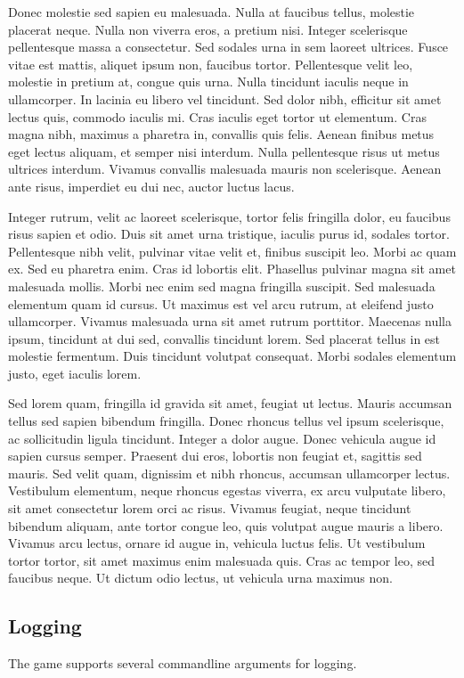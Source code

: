 \documentclass[a4paper,11pt,report]{scrartcl}
\begin{document}
Donec molestie sed sapien eu malesuada. Nulla at faucibus tellus, molestie placerat neque. Nulla non viverra eros, a pretium nisi. Integer scelerisque pellentesque massa a consectetur. Sed sodales urna in sem laoreet ultrices. Fusce vitae est mattis, aliquet ipsum non, faucibus tortor. Pellentesque velit leo, molestie in pretium at, congue quis urna. Nulla tincidunt iaculis neque in ullamcorper. In lacinia eu libero vel tincidunt. Sed dolor nibh, efficitur sit amet lectus quis, commodo iaculis mi. Cras iaculis eget tortor ut elementum. Cras magna nibh, maximus a pharetra in, convallis quis felis. Aenean finibus metus eget lectus aliquam, et semper nisi interdum. Nulla pellentesque risus ut metus ultrices interdum. Vivamus convallis malesuada mauris non scelerisque. Aenean ante risus, imperdiet eu dui nec, auctor luctus lacus.

Integer rutrum, velit ac laoreet scelerisque, tortor felis fringilla dolor, eu faucibus risus sapien et odio. Duis sit amet urna tristique, iaculis purus id, sodales tortor. Pellentesque nibh velit, pulvinar vitae velit et, finibus suscipit leo. Morbi ac quam ex. Sed eu pharetra enim. Cras id lobortis elit. Phasellus pulvinar magna sit amet malesuada mollis. Morbi nec enim sed magna fringilla suscipit. Sed malesuada elementum quam id cursus. Ut maximus est vel arcu rutrum, at eleifend justo ullamcorper. Vivamus malesuada urna sit amet rutrum porttitor. Maecenas nulla ipsum, tincidunt at dui sed, convallis tincidunt lorem. Sed placerat tellus in est molestie fermentum. Duis tincidunt volutpat consequat. Morbi sodales elementum justo, eget iaculis lorem.

Sed lorem quam, fringilla id gravida sit amet, feugiat ut lectus. Mauris accumsan tellus sed sapien bibendum fringilla. Donec rhoncus tellus vel ipsum scelerisque, ac sollicitudin ligula tincidunt. Integer a dolor augue. Donec vehicula augue id sapien cursus semper. Praesent dui eros, lobortis non feugiat et, sagittis sed mauris. Sed velit quam, dignissim et nibh rhoncus, accumsan ullamcorper lectus. Vestibulum elementum, neque rhoncus egestas viverra, ex arcu vulputate libero, sit amet consectetur lorem orci ac risus. Vivamus feugiat, neque tincidunt bibendum aliquam, ante tortor congue leo, quis volutpat augue mauris a libero. Vivamus arcu lectus, ornare id augue in, vehicula luctus felis. Ut vestibulum tortor tortor, sit amet maximus enim malesuada quis. Cras ac tempor leo, sed faucibus neque. Ut dictum odio lectus, ut vehicula urna maximus non. 

\subsection{Logging}
The game supports several commandline arguments for logging.\\
\end{document}
